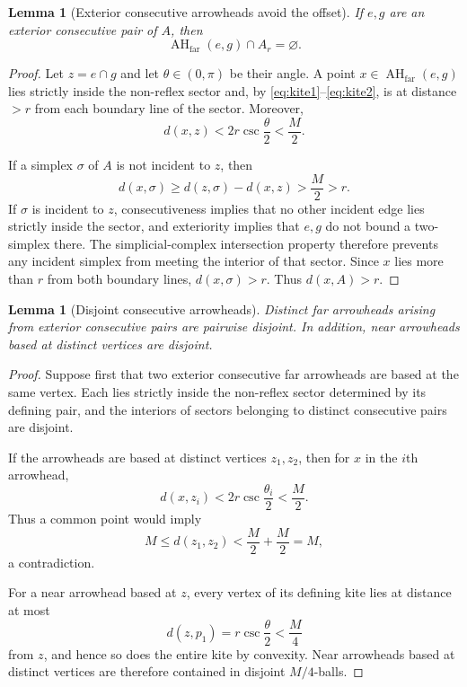 \documentclass[11pt]{article}
\newtheorem{lemma}[theorem]{Lemma}
\newcommand{\AHfar}{\operatorname{AH}_{\mathrm{far}}}
\numberwithin{equation}{section}
\begin{document}
\begin{lemma}[Exterior consecutive arrowheads avoid the offset]\label{lem:ext-avoid-offset}
If $e,g$ are an exterior consecutive pair of $A$, then
\[
\boxed{\AHfar(e,g)\cap A_r=\varnothing.}
\]
\end{lemma}

\begin{proof}
Let $z=e\cap g$ and let $\theta\in(0,\pi)$ be their angle. A point $x\in\AHfar(e,g)$ lies strictly inside the non-reflex sector and, by \eqref{eq:kite1}--\eqref{eq:kite2}, is at distance $>r$ from each boundary line of the sector. Moreover,
\[
d(x,z)<2r\csc\frac\theta2<\frac M2.
\]

If a simplex $\sigma$ of $A$ is not incident to $z$, then
\[
d(x,\sigma)\ge d(z,\sigma)-d(x,z)>\frac M2>r.
\]
If $\sigma$ is incident to $z$, consecutiveness implies that no other incident edge lies strictly inside the sector, and exteriority implies that $e,g$ do not bound a two-simplex there. The simplicial-complex intersection property therefore prevents any incident simplex from meeting the interior of that sector. Since $x$ lies more than $r$ from both boundary lines, $d(x,\sigma)>r$. Thus $d(x,A)>r$.
\end{proof}

\begin{lemma}[Disjoint consecutive arrowheads]\label{lem:disjoint-arrowheads}
Distinct far arrowheads arising from exterior consecutive pairs are pairwise disjoint. In addition, near arrowheads based at distinct vertices are disjoint.
\end{lemma}

\begin{proof}
Suppose first that two exterior consecutive far arrowheads are based at the same vertex. Each lies strictly inside the non-reflex sector determined by its defining pair, and the interiors of sectors belonging to distinct consecutive pairs are disjoint.

If the arrowheads are based at distinct vertices $z_1,z_2$, then for $x$ in the $i$th arrowhead,
\[
d(x,z_i)<2r\csc\frac{\theta_i}{2}<\frac M2.
\]
Thus a common point would imply
\[
M\le d(z_1,z_2)<\frac M2+\frac M2=M,
\]
a contradiction.

For a near arrowhead based at $z$, every vertex of its defining kite lies at distance at most
\[
d(z,p_1)=r\csc\frac\theta2<\frac M4
\]
from $z$, and hence so does the entire kite by convexity. Near arrowheads based at distinct vertices are therefore contained in disjoint $M/4$-balls.
\end{proof}
\end{document}
